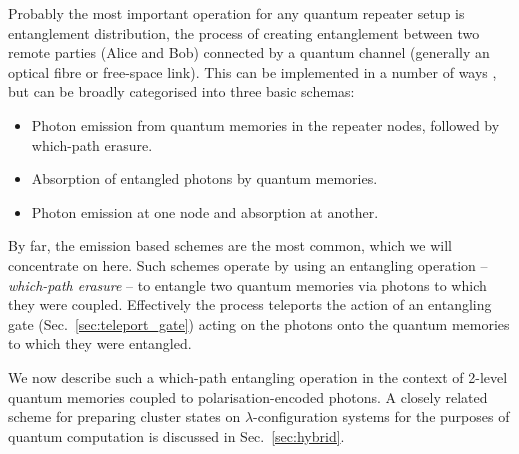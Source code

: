 Probably the most important operation for any quantum repeater setup is entanglement distribution, the process of creating entanglement between two remote parties (Alice and Bob) connected by a quantum channel (generally an optical fibre or free-space link). This can be implemented in a number of ways \cite{bib:Bennett96, bib:enk98, bib:bennett93, bib:sangouard11, bib:childress06, bib:loock06, bib:munro08}, but can be broadly categorised into three basic schemas:
\begin{itemize}
\item Photon emission from quantum memories in the repeater nodes, followed by which-path erasure.
\item Absorption of entangled photons by quantum memories.
\item Photon emission at one node and absorption at another.
\end{itemize}
By far, the emission based schemes are the most common, which we will concentrate on here. Such schemes operate by using an entangling operation -- \textit{which-path erasure} -- to entangle two quantum memories via photons to which they were coupled. Effectively the process teleports the action of an entangling gate (Sec.~\ref{sec:teleport_gate}) acting on the photons onto the quantum memories to which they were entangled.

We now describe such a which-path entangling operation in the context of 2-level quantum memories coupled to polarisation-encoded photons. A closely related scheme for preparing cluster states on $\lambda$-configuration systems for the purposes of quantum computation is discussed in Sec.~\ref{sec:hybrid}.

